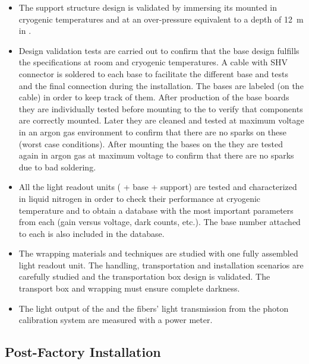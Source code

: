 \begin{itemize}
\item The  support structure design is validated by immersing its mounted  in cryogenic temperatures and at an over-pressure equivalent to %
a depth of \SI{12}{m} in \lar{}. %
\item Design validation tests are carried out to confirm that the  base design fulfills the specifications at room and cryogenic temperatures. A cable with SHV connector is soldered to each  base to facilitate the different base and  tests and the final  connection during the installation. The  bases are labeled (on the cable) in order to keep track of them. After production of the  base boards they are individually tested before mounting to the  to verify that components are correctly mounted. Later they are cleaned and tested at maximum voltage in an argon gas environment to confirm that there are no sparks on these (worst case conditions).
After mounting the bases on the  they are tested again in argon gas at maximum voltage to confirm that there are no sparks due to bad soldering.
\item All the light readout units ( + base + support) are tested and characterized in liquid nitrogen in order to check their performance at cryogenic temperature and to obtain a database with the most important parameters from each  (gain versus voltage, dark counts, etc.). The  base number attached to each  is also included in the database. 
\item The wrapping materials and techniques are studied with one fully assembled light readout unit. The handling, transportation and installation scenarios are carefully studied and the transportation box design is validated. The transport box and  wrapping must  ensure complete darkness. 
\item The light output of the  and the fibers' light transmission from the photon calibration system are measured with a power meter.
\end{itemize}

 \subsection{Post-Factory Installation}
 \label{sec:fddp-pd-10.2}
 
